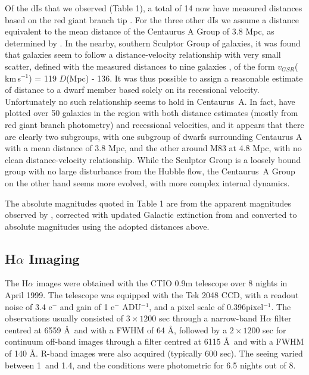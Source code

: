 \documentclass[preprint]{aastex}
\def\kms{\mbox{\,km\,s$^{-1}$}}
\begin{document}
Of the dIs that we observed (Table 1), a total of 14 now have measured 
distances based on the red giant branch tip \citep{k02, k07}.
For the three other dIs we assume a distance equivalent to the mean distance of
the Centaurus A Group of 3.8 Mpc, as determined by \citet{k07}.
In the nearby, southern Sculptor Group of galaxies,
it was found that galaxies seem to follow a distance-velocity relationship 
with very small scatter, defined with the measured distances to nine galaxies
\citep{jfb98},
of the form $v_{GSR}$(\kms ) = 119 $D$(Mpc) - 136. 
It was thus possible to assign a reasonable estimate of distance to a 
dwarf member based solely on its recessional velocity.
Unfortunately no such relationship seems to hold in
Centaurus~A. In fact, \citet{k07} have plotted over
50 galaxies in the region with both distance estimates (mostly from
red giant branch photometry) and recessional velocities, and it appears
that there are clearly two subgroups, with one subgroup of dwarfs
surrounding Centaurus A with a mean distance of 3.8 Mpc, and the other
around M83 at 4.8 Mpc, with no clean distance-velocity relationship.
While the Sculptor Group is a loosely bound group with no large disturbance from
the Hubble flow, the Centaurus~A Group on the other hand seems more evolved,
with more complex internal dynamics. 

The absolute magnitudes quoted in Table 1 are from the apparent magnitudes 
observed by \citet{c95}, corrected with updated Galactic extinction 
from \citet{sfd98} and converted to absolute magnitudes using the
adopted distances above.


\subsection{H$\alpha$ Imaging}

The H$\alpha$ images were obtained with the CTIO 0.9m telescope over 8 nights
in April 1999. The telescope was equipped with the Tek 2048 CCD, with a 
readout noise of 3.4 e$^-$ and gain of 1 e$^-$ ADU$^{-1}$,  
and a pixel scale of 0.396\arcsec pixel$^{-1}$. The observations usually consisted of 
$3 \times 1200$ sec through a narrow-band H$\alpha$ filter centred at 6559 \AA\ 
and with a FWHM of 64 \AA, followed by a $2 \times 1200$ sec for continuum 
off-band images through a filter centred at 6115 \AA\ and with a FWHM of 140 
\AA . R-band images were also acquired (typically 600 sec). The seeing 
varied between 1\arcsec\ and 1.4\arcsec ,
and the conditions were photometric for 6.5 nights out of 8.
\end{document}
